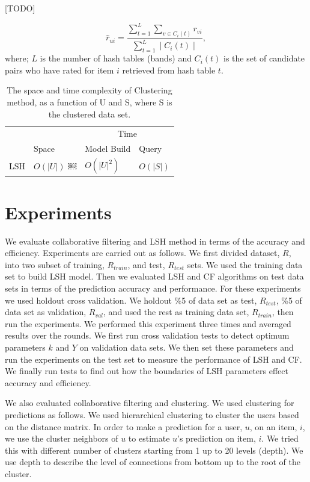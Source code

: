 \documentclass[conference]{IEEEtran}
\begin{document}
[TODO]

\begin{equation}
\hat{r}_{ui} = \frac{\sum\limits_{t=1}^{L} \sum\limits_{v \in C_i(t)} r_{vi}}{\sum\limits_{t=1}^{L} \mid C_i(t) \mid} ,
\label{eq:lsh-prediction}
\end{equation}
where; $L$ is the number of hash tables (bands) and  $C_i(t)$ is the set of 
candidate pairs who have rated for item $i$ retrieved from hash table $t$.

\begin{table}
\centering
\begin{tabular}{llll}
\hline
& & \multicolumn {2}{c}{Time} \\
\cline{3-4}
     & Space & Model Build  & Query \\
\hline
LSH & $O(|U|)$ ￼& $O(|U|^2)$ &$O(|S|)$ \\
\hline
\end{tabular}
\caption{The space and time complexity of Clustering  method, as a function of U and S, where S is the clustered data set.}
\label{table:complexity-lsh}
\end{table}

\section{Experiments}
\label{sec:experiements}

We evaluate collaborative filtering and LSH method in terms of the accuracy 
and efficiency. Experiments are carried out as follows. We first divided 
dataset, $R$, into two subset of training, $R_{train}$, and test, $R_{test}$ 
sets. We used the training data set to build LSH model. Then we evaluated LSH 
and CF algorithms on test data sets in terms of the prediction accuracy and
performance. For these experiments we used holdout cross validation. We holdout
\%5 of data set as test, $R_{test}$, \%5 of data set as validation, $R_{val}$, 
and used the rest as training data set, $R_{train}$, then run the experiments. 
We performed this experiment three times and averaged results over the rounds. 
We first run cross validation tests to detect optimum parameters $k$ and $Y$ on 
validation data sets. We then set these parameters and run the experiments on 
the test set to measure the performance of LSH and CF. We finally run tests to 
find out how the boundaries of LSH parameters effect accuracy and efficiency. 

We also evaluated collaborative filtering and clustering. We used clustering for 
predictions as follows. We used hierarchical clustering to cluster the users 
based on the distance matrix. In order to make a prediction for a user, $u$, on
an item, $i$, we use the cluster neighbors of $u$ to estimate $u$'s prediction 
on item, $i$. We tried this with different number of clusters starting from 1 
up to 20 levels (depth). We use depth to describe the level of connections from
bottom up to the root of the cluster.
\end{document}
